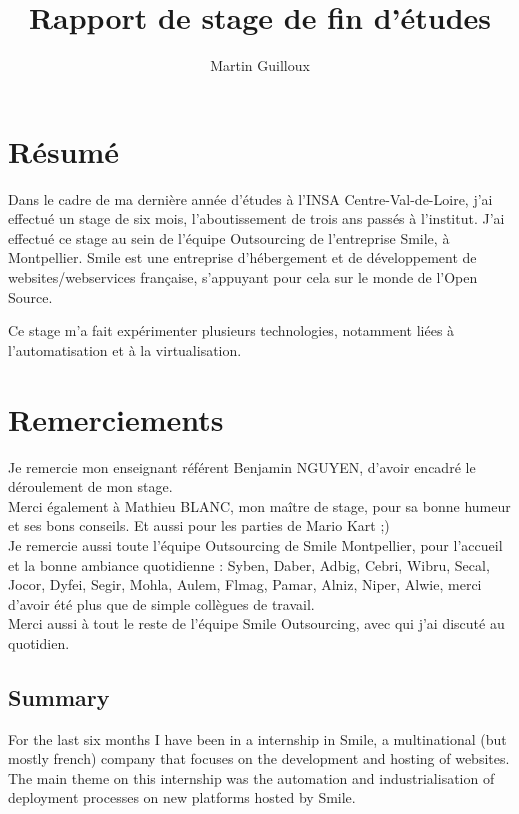 \documentclass[14 pt]{extreport}
\title{\textbf{Rapport de stage de fin d'études}}
\author{Martin Guilloux}
\begin{document}
\maketitle


\section*{Résumé}
Dans le cadre de ma dernière année d'études à l'INSA Centre-Val-de-Loire, j'ai effectué un stage de six mois, l'aboutissement de trois ans passés à l'institut. J'ai effectué ce stage au sein de l'équipe Outsourcing de l'entreprise Smile, à Montpellier. Smile est une entreprise d'hébergement et de développement de websites/webservices française, s'appuyant pour cela sur le monde de l'Open Source.

Ce stage m'a fait expérimenter plusieurs technologies, notamment liées à l'automatisation et à la virtualisation.

\section*{Remerciements}
Je remercie mon enseignant référent Benjamin NGUYEN, d'avoir encadré le déroulement de mon stage.\\
Merci également à Mathieu BLANC, mon maître de stage, pour sa bonne humeur et ses bons conseils. Et aussi pour les parties de Mario Kart ;)\\ %
Je remercie aussi toute l'équipe Outsourcing de Smile Montpellier, pour l'accueil et la bonne ambiance quotidienne : Syben, Daber, Adbig, Cebri, Wibru, Secal, Jocor, Dyfei, Segir, Mohla, Aulem, Flmag, Pamar, Alniz, Niper, Alwie, merci d'avoir été plus que de simple collègues de travail.\\
Merci aussi à tout le reste de l'équipe Smile Outsourcing, avec qui j'ai discuté au quotidien. 


\tableofcontents

\newpage
\subsection*{Summary}

For the last six months I have been in a internship in Smile, a multinational (but mostly french) company that focuses on the development and hosting of websites. The main theme on this internship was the automation and industrialisation of deployment processes on new platforms hosted by Smile.
\end{document}
